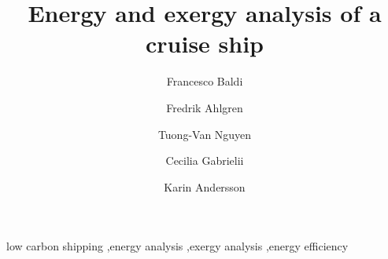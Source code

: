 \documentclass[preprint,12pt]{elsarticle}
\begin{document}
\begin{frontmatter}



\title{Energy and exergy analysis of a cruise ship}


\author[EPFL]{Francesco Baldi}
\author[Linneus]{Fredrik Ahlgren}
\author[DTU]{Tuong-Van Nguyen}
\author[CTU]{Cecilia Gabrielii}
\author[CTU]{Karin Andersson}

\address[EPFL]{Industrial Process Energy Systems Engineering (IPESE), \'{E}cole Polytechnique F\'{e}d\'{e}rale de Lausanne, 1950, Sion, Switzerland}
\address[Linneus]{Kalmar Maritime Academy, Linnaeus University, Kalmar, Sweden}
\address[DTU]{Department of Mechanical Engineering, Technical University of Denmark, Lyngby, Denmark}
\address[CTU]{Department of Mechanics and Maritime Sciences, Chalmers University of technology, Gothenburg, Sweden}

\begin{abstract}

\end{abstract}

\begin{keyword}



low carbon shipping \sep energy analysis \sep exergy analysis \sep energy efficiency

\end{keyword}

\end{frontmatter}
\end{document}
